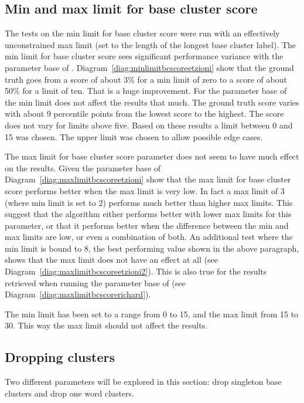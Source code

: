 \subsection{Min and max limit for base cluster score}
The tests on the min limit for base cluster score were run with an effectively unconstrained max limit (set to the length of the longest base cluster label). The min limit for base cluster score sees significant performance variance with the parameter base of \citeauthor{Oren1998}. Diagram~\ref{diag:minlimitbcscoreetzioni} show that the ground truth goes from a score of about 3\% for a min limit of zero to a score of about 50\% for a limit of ten. That is a huge improvement. For the parameter base of \supervisor the min limit does not affect the results that much. The ground truth score varies with about 9 percentile points from the lowest score to the highest. The score does not vary for limits above five. Based on these results a limit between 0 and 15 was chosen. The upper limit was chosen to allow possible edge cases.

The max limit for base cluster score parameter does not seem to have much effect on the results. Given the parameter base of \citeauthor{Oren1998} Diagram~\ref{diag:maxlimitbcscoreetzioni} show that the max limit for base cluster score performs better when the max limit is very low. In fact a max limit of 3 (where min limit is set to 2) performs much better than higher max limits. This suggest that the algorithm either performs better with lower max limits for this parameter, or that it performs better when the difference between the min and max limits are low, or even a combination of both. An additional test where the min limit is bound to 8, the best performing value shown in the above paragraph, shows that the max limit does not have an effect at all (see Diagram~\ref{diag:maxlimitbcscoreetzioni2}). This is also true for the results retrieved when running the parameter base of \supervisor (see Diagram~\ref{diag:maxlimitbcscorerichard}).

The min limit has been set to a range from 0 to 15, and the max limit from 15 to 30. This way the max limit should not affect the results.

\subsection{Dropping clusters}
Two different parameters will be explored in this section: drop singleton base clusters and drop one word clusters.

